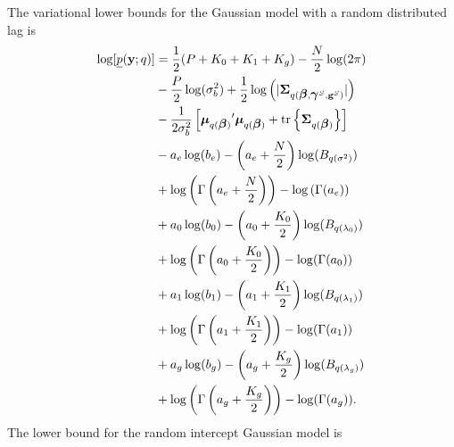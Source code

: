 \documentclass[10pt]{article}
\newcommand{\bbeta}{{\mbox{\boldmath$\beta$}}}
\newcommand{\bgamma}{{\mbox{\boldmath$\gamma$}}}
\newcommand{\bmu}{{\mbox{\boldmath$\mu$}}}
\newcommand{\bSigma}{{\mbox{\boldmath$\Sigma$}}}
\newcommand{\by}{\textbf{y}}
\newcommand{\bg}{\textbf{g}}
\newcommand{\up}{\underline{p}}
\begin{document}
The variational lower bounds for the Gaussian model with a random distributed lag is
	\begin{align*}
		\log[ \up(\by; q) ] &= \frac{1}{2}(P + K_0 + K_1 + K_g) - \frac{N}{2}\log(2\pi) \\
			&- \frac{P}{2}\log(\sigma_b^2) + \frac{1}{2}\log\left(|\bSigma_{q(\bbeta, \bgamma^S, \bg^S)}|\right) \\
			&- \frac{1}{2\sigma_b^2}\left[ {\bmu_{q(\bbeta)}}'\bmu_{q(\bbeta)} + \text{tr}\left\{\bSigma_{q(\bbeta)}\right\} \right] \\
			&- a_e\log(b_e) - \left(a_e + \frac{N}{2}\right)\log(B_{q(\sigma^2)}) \\
			&+ \log\left(\Gamma\left(a_e + \frac{N}{2}\right)\right) - \log\left(\Gamma(a_e)\right) \\
			&+ a_0\log(b_0) - \left(a_0 + \frac{K_0}{2}\right)\log(B_{q(\lambda_0)}) \\
			&+ \log\left(\Gamma\left(a_0 + \frac{K_0}{2}\right)\right) - \log(\Gamma(a_0))	\\
			&+ a_1\log(b_1) - \left(a_1 + \frac{K_1}{2}\right)\log(B_{q(\lambda_1)}) \\
			&+ \log\left(\Gamma\left(a_1 + \frac{K_1}{2}\right)\right) - \log(\Gamma(a_1))	\\
			&+ a_g\log(b_g) - \left(a_g + \frac{K_g}{2}\right)\log(B_{q(\lambda_g)}) \\
			&+ \log\left(\Gamma\left(a_g + \frac{K_g}{2}\right)\right) - \log(\Gamma(a_g)).
	\end{align*}
	The lower bound for the random intercept Gaussian model is %
\end{document}
